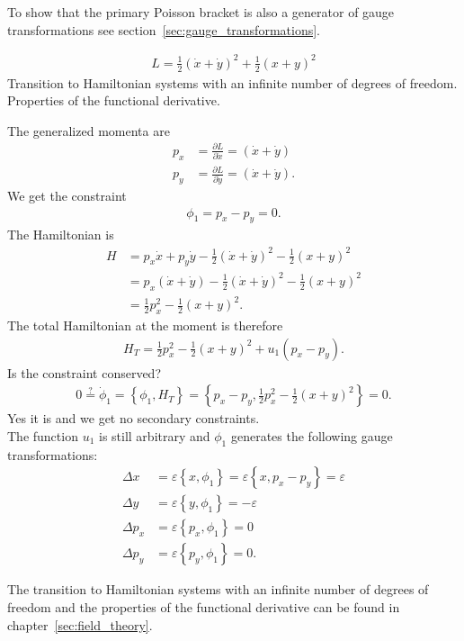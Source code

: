 \begin{solution}
To show that the primary Poisson bracket is also a generator of gauge transformations see section~\vref{sec:gauge_transformations}.
\end{solution}


\begin{exercise}
\begin{align*}
L = \frac{1}{2} (\dot{x} + \dot{y})^2 + \frac{1}{2} (x + y)^2
\end{align*}
Transition to Hamiltonian systems with an infinite number of degrees of freedom. \\
Properties of the functional derivative. 
\end{exercise}
\begin{solution}
The generalized momenta are
\begin{align*}
p_x &= \frac{\partial L}{\partial \dot{x}} = (\dot{x} + \dot{y}) \\
p_y &= \frac{\partial L}{\partial \dot{y}} = (\dot{x} + \dot{y}) .
\end{align*}
We get the constraint 
\begin{align*}
\phi_1 = p_x - p_y = 0.
\end{align*}
The Hamiltonian is
\begin{align*}
H &= p_x \dot{x} + p_y \dot{y} - \frac{1}{2} (\dot{x} + \dot{y})^2 - \frac{1}{2} (x + y)^2 \\
&= p_x (\dot{x} + \dot{y}) - \frac{1}{2} (\dot{x} + \dot{y})^2 - \frac{1}{2} (x + y)^2 \\
&= \frac{1}{2} p_x^2 - \frac{1}{2} (x + y)^2.
\end{align*}
The total Hamiltonian at the moment is therefore
\begin{align*}
H_T = \frac{1}{2} p_x^2 - \frac{1}{2} (x + y)^2 + u_1 (p_x - p_y).
\end{align*}
Is the constraint conserved?
\begin{align*}
0 \overset{?}{=} \dot{\phi}_1 = \left \{ \phi_1,H_T \right \} = \left \{ p_x - p_y,\frac{1}{2} p_x^2 - \frac{1}{2} (x + y)^2 \right \} = 0.
\end{align*}
Yes it is and we get no secondary constraints. \\
The function $u_1$ is still arbitrary and $\phi_1$ generates the following gauge transformations:
\begin{align*}
\Delta x &= \varepsilon \left \{ x,\phi_1 \right \} = \varepsilon \left \{ x,p_x - p_y \right \} = \varepsilon \\
\Delta y &= \varepsilon \left \{ y,\phi_1 \right \} = - \varepsilon \\
\Delta p_x &= \varepsilon \left \{ p_x,\phi_1 \right \} = 0 \\
\Delta p_y &= \varepsilon \left \{ p_y,\phi_1 \right \} = 0.
\end{align*}

The transition to Hamiltonian systems with an infinite number of degrees of freedom and the properties of the functional derivative can be found in chapter~\ref{sec:field_theory}.
\end{solution}


